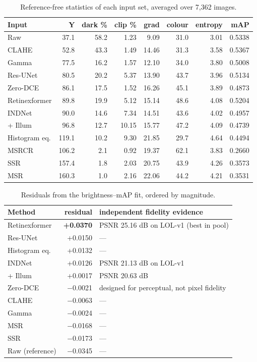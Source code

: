 \begin{table}[t]
\centering
\small
\caption{Reference-free statistics of each input set, averaged over 7,362 images.}
\label{tab:table2}
\begin{tabular}{lrrrrrrr}
\toprule
Input & Y & dark \% & clip \% & grad & colour & entropy & mAP \\
\midrule
Raw & 37.1 & 58.2 & 1.23 & 9.09 & 31.0 & 3.01 & 0.5338 \\
CLAHE & 52.8 & 43.3 & 1.49 & 14.46 & 31.3 & 3.58 & 0.5367 \\
Gamma & 77.5 & 16.2 & 1.57 & 12.10 & 34.0 & 3.80 & 0.5008 \\
Res-UNet & 80.5 & 20.2 & 5.37 & 13.90 & 43.7 & 3.96 & 0.5134 \\
Zero-DCE & 86.1 & 17.5 & 1.52 & 16.26 & 45.1 & 3.89 & 0.4873 \\
Retinexformer & 89.8 & 19.9 & 5.12 & 15.14 & 48.6 & 4.08 & 0.5204 \\
INDNet & 90.0 & 14.6 & 7.34 & 14.51 & 43.6 & 4.02 & 0.4957 \\
+ Illum & 96.8 & 12.7 & 10.15 & 15.77 & 47.2 & 4.09 & 0.4739 \\
Histogram eq. & 119.1 & 10.2 & 9.30 & 21.85 & 29.7 & 4.64 & 0.4494 \\
MSRCR & 106.2 & 2.1 & 0.92 & 19.37 & 62.1 & 3.83 & 0.2660 \\
SSR & 157.4 & 1.8 & 2.03 & 20.75 & 43.9 & 4.26 & 0.3573 \\
MSR & 160.3 & 1.0 & 2.16 & 22.06 & 44.2 & 4.21 & 0.3531 \\
\bottomrule
\end{tabular}
\end{table}

\begin{table}[t]
\centering
\small
\caption{Residuals from the brightness–mAP fit, ordered by magnitude.}
\label{tab:table3}
\begin{tabular}{lrl}
\toprule
Method & residual & independent fidelity evidence \\
\midrule
Retinexformer & \textbf{+0.0370} & PSNR 25.16 dB on LOL-v1 (best in pool) \\
Res-UNet & +0.0150 & — \\
Histogram eq. & +0.0132 & — \\
INDNet & +0.0126 & PSNR 21.13 dB on LOL-v1 \\
+ Illum & +0.0017 & PSNR 20.63 dB \\
Zero-DCE & $-$0.0021 & designed for perceptual, not pixel fidelity \\
CLAHE & $-$0.0063 & — \\
Gamma & $-$0.0024 & — \\
MSR & $-$0.0168 & — \\
SSR & $-$0.0173 & — \\
Raw (reference) & $-$0.0345 & — \\
\bottomrule
\end{tabular}
\end{table}

